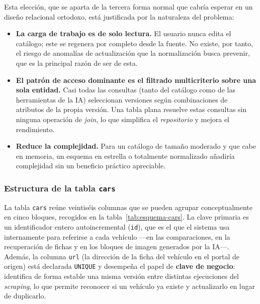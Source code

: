 Esta elección, que se aparta de la tercera forma normal que cabría esperar en un
diseño relacional ortodoxo, está justificada por la naturaleza del problema:

\begin{itemize}
    \item \textbf{La carga de trabajo es de solo lectura.} El usuario nunca
    edita el catálogo; este se regenera por completo desde la fuente. No existe,
    por tanto, el riesgo de anomalías de actualización que la normalización busca
    prevenir, que es la principal razón de ser de esta.

    \item \textbf{El patrón de acceso dominante es el filtrado multicriterio
    sobre una sola entidad.} Casi todas las consultas (tanto del catálogo como de
    las herramientas de la IA) seleccionan versiones según combinaciones de
    atributos de la propia versión. Una tabla plana resuelve estas consultas sin
    ninguna operación de \emph{join}, lo que simplifica el \emph{repositorio} y
    mejora el rendimiento.

    \item \textbf{Reduce la complejidad.} Para un catálogo de tamaño moderado y
    que cabe en memoria, un esquema en estrella o totalmente normalizado añadiría
    complejidad sin un beneficio práctico apreciable.
\end{itemize}

\subsubsection*{Estructura de la tabla \texttt{cars}}

La tabla \texttt{cars} reúne veintiséis columnas que se pueden agrupar
conceptualmente en cinco bloques, recogidos en la
tabla~\ref{tab:esquema-cars}. La clave primaria es un identificador entero
autoincremental (\texttt{id}), que es el que el sistema usa internamente para
referirse a cada vehículo —en las comparaciones, en la recuperación de fichas y
en los bloques de imagen generados por la IA—. Además, la columna \texttt{url}
(la dirección de la ficha del vehículo en el portal de origen) está declarada
\texttt{UNIQUE} y desempeña el papel de \textbf{clave de negocio}: identifica de
forma estable una misma versión entre distintas ejecuciones del \emph{scraping},
lo que permite reconocer si un vehículo ya existe y actualizarlo en lugar de
duplicarlo.

